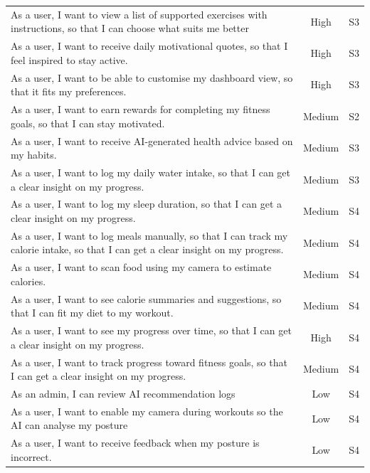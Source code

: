 \begin{xltabular}{\textwidth}{Xcc}
	As a user, I want to view a list of supported exercises with instructions, so that I can choose what suits me better & High & S3 \\
	
	As a user, I want to receive daily motivational quotes, so that I feel inspired to stay active. & High & S3 \\
	
	As a user, I want to be able to customise my dashboard view, so that it fits my preferences. & High & S3 \\
	
	As a user, I want to earn rewards for completing my fitness goals, so that I can stay motivated. & Medium & S2 \\
	
	As a user, I want to receive AI-generated health advice based on my habits. & Medium & S3 \\
	
	As a user, I want to log my daily water intake, so that I can get a clear insight on my progress. & Medium & S3 \\
	
	As a user, I want to log my sleep duration, so that I can get a clear insight on my progress. & Medium & S4 \\
	
	As a user, I want to log meals manually, so that I can track my calorie intake, so that I can get a clear insight on my progress. & Medium & S4 \\
	
	As a user, I want to scan food using my camera to estimate calories. & Medium & S4 \\
	
	As a user, I want to see calorie summaries and suggestions, so that I can fit my diet to my workout. & Medium & S4 \\
	
	As a user, I want to see my progress over time, so that I can get a clear insight on my progress. & High & S4 \\
	
	As a user, I want to track progress toward fitness goals, so that I can get a clear insight on my progress. & Medium & S4 \\
	
	As an admin, I can review AI recommendation logs & Low & S4 \\
	
	As a user, I want to enable my camera during workouts so the AI can analyse my posture & Low & S4 \\
	
	As a user, I want to receive feedback when my posture is incorrect. & Low & S4 \\
	
\end{xltabular}


